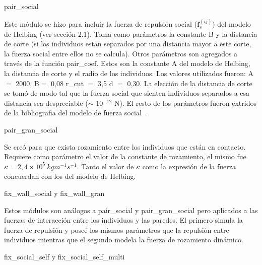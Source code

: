 {\Large pair\_social}

Este módulo se hizo para incluir la fuerza de repulsión social ($\mathbf{f}_s^{(ij)}$) del modelo de Helbing (ver sección 2.1). Toma como parámetros la constante B y la distancia de corte (si los individuos estan separados por una distancia mayor a este corte, la fuerza social entre ellos no se calcula).
Otros parámetros son agregados a través de la función pair\_coef. Estos son la constante A del modelo de Helbing, la distancia 
de corte y el radio de los individuos. Los valores utilizados fueron: A $=$ 2000, B$=$ 0,08 r\_cut $=$ 3,5 d $=$ 0,30.
La elección de la distancia de corte se tomó de modo tal que la fuerza social que sienten individuos separados a esa distancia
sea despreciable ($\sim$ 10$^{-12}$ N). El resto de los parámetros fueron extridos de la bibliografia del modelo de fuerza social~\cite{Helbing1}.

{\Large pair\_gran\_social}

Se creó para que exista rozamiento entre los individuos que están en contacto. Requiere como parámetro el valor de la constante de rozamiento, el mismo fue $\kappa =2,4 \times 10^5~kgm^{-1}s^{-1}$. Tanto el valor de $\kappa$ como la expresión de la fuerza concuerdan con los del modelo de Helbing.

{\Large fix\_wall\_social y fix\_wall\_gran}

Estos módulos son análogos a pair\_social y pair\_gran\_social pero aplicados a las fuerzas de interacción entre los individuos y las paredes. El primero simula la fuerza de repulsión y poseé los mismos parámetros que la repulsión entre individuos mientras que el segundo modela la fuerza de rozamiento dinámico. 

{\Large fix\_social\_self y fix\_social\_self\_multi}

